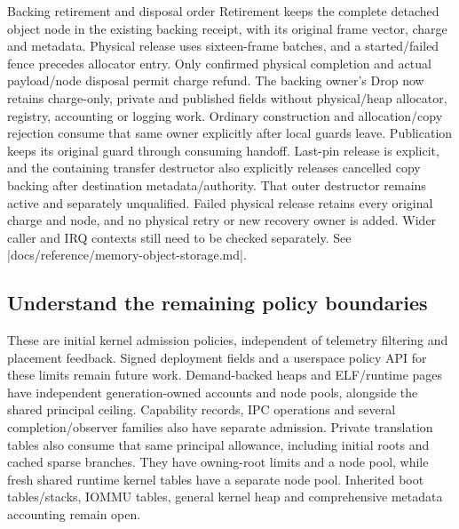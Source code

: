 \begin{implementationdetail}{Backing retirement and disposal order}
Retirement keeps the complete detached object node in the existing backing
receipt, with its original frame vector, charge and metadata. Physical release
uses sixteen-frame batches, and a started/failed fence precedes allocator entry.
Only confirmed physical completion and actual payload/node disposal permit
charge refund. The backing owner's Drop now retains charge-only, private and
published fields without physical/heap allocator, registry, accounting or logging
work. Ordinary construction and allocation/copy rejection consume that same
owner explicitly after local guards leave. Publication keeps its original guard
through consuming handoff. Last-pin release is explicit, and the containing transfer
destructor also explicitly releases cancelled copy backing after destination
metadata/authority. That outer destructor remains active and separately
unqualified. Failed physical release retains every original charge and node, and
no physical retry or new recovery owner is added. Wider caller and IRQ contexts
still need to be checked separately. See
\repofile|docs/reference/memory-object-storage.md|.
\end{implementationdetail}

\subsection{Understand the remaining policy boundaries}

These are initial kernel admission policies, independent of telemetry filtering
and placement feedback. Signed deployment fields and a userspace policy API for
these limits remain future work. Demand-backed heaps and ELF/runtime pages have
independent generation-owned accounts and node pools, alongside the shared
principal ceiling. Capability records,
IPC operations and several completion/observer families also have separate
admission. Private translation tables also consume that same principal allowance, including
initial roots and cached sparse branches. They have owning-root limits and a node pool, while
fresh shared runtime kernel tables have a separate node pool. Inherited boot
tables/stacks, IOMMU tables, general kernel heap and comprehensive metadata
accounting remain open.

